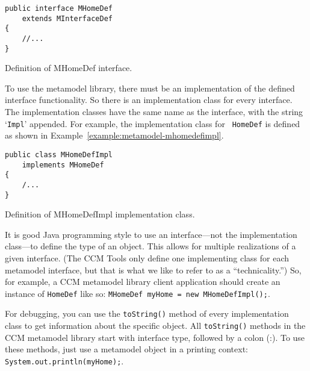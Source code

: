 \begin{Example}
\begin{minifbox}
\begin{small}
\begin{verbatim}
public interface MHomeDef
    extends MInterfaceDef
{
    //...
}
\end{verbatim}
\end{small}
\end{minifbox}
\caption{Definition of MHomeDef interface.}
\label{example:metamodel-mhomedef}
\end{Example}

To use the metamodel library, there must be an implementation of the defined
interface functionality. So there is an implementation class for every
interface. The implementation classes have the same name as the interface, with
the string `{\tt Impl}' appended. For example, the implementation class for {\tt
HomeDef} is defined as shown in Example~\ref{example:metamodel-mhomedefimpl}.

\begin{Example}
\begin{minifbox}
\begin{small}
\begin{verbatim}
public class MHomeDefImpl
    implements MHomeDef
{
    /...
}
\end{verbatim}
\end{small}
\end{minifbox}
\caption{Definition of MHomeDefImpl implementation class.}
\label{example:metamodel-mhomedefimpl}
\end{Example}

It is good Java programming style to use an interface---not the implementation
class---to define the type of an object. This allows for multiple realizations
of a given interface. (The CCM Tools only define one implementing class for each
metamodel interface, but that is what we like to refer to as a
``technicality.'') So, for example, a CCM metamodel library client application
should create an instance of {\tt HomeDef} like so:
\verb+MHomeDef myHome = new MHomeDefImpl();+.

For debugging, you can use the {\tt toString()} method of every implementation
class to get information about the specific object. All {\tt toString()} methods
in the CCM metamodel library start with interface type, followed by a colon (:).
To use these methods, just use a metamodel object in a printing context:
\verb+System.out.println(myHome);+.


